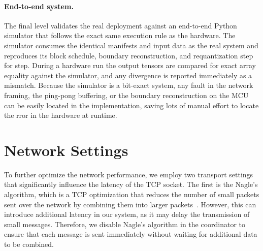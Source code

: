 \paragraph{End-to-end system.}
The final level validates the real deployment against an end-to-end Python simulator that follows the exact same execution rule as the hardware. 
The simulator consumes the identical manifests and input data as the real system and reproduces its block schedule, boundary reconstruction, and requantization step for step. During a hardware run the output tensors are compared for exact array equality against the simulator, and any divergence is reported immediately as a mismatch.
Because the simulator is a bit-exact system, any fault in the network framing, the ping-pong buffering, or the boundary reconstruction on the MCU can be easily located in the implementation, saving lots of manual effort to locate the rror in the hardware at runtime.



\section{Network Settings}
\label{sec:implementation-miscellaneous}
To further optimize the network performance, we employ two transport settings that significantly influence the latency of the TCP socket. The first is the Nagle's algorithm, which is a TCP optimization that reduces the number of small packets sent over the network by combining them into larger packets~\cite{tcp,nagle}. However, this can introduce additional latency in our system, as it may delay the transmission of small messages. Therefore, we disable Nagle's algorithm in the coordinator to ensure that each message is sent immediately without waiting for additional data to be combined.

